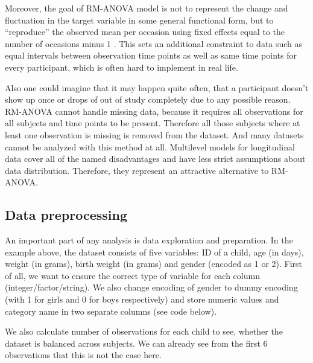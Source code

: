 \documentclass[
  12pt,
]{article}
\begin{document}
Moreover, the goal of RM-ANOVA model is not to represent the change and
fluctuation in the target variable in some general functional form, but
to ``reproduce'' the observed mean per occasion using fixed effects
equal to the number of occasions minus 1 \autocite[p.96]{hoffman_2015}.
This sets an additional constraint to data such as equal intervals
between observation time points as well as same time points for every
participant, which is often hard to implement in real life.

Also one could imagine that it may happen quite often, that a
participant doesn't show up once or drops of out of study completely due
to any possible reason. RM-ANOVA cannot handle missing data, because it
requires all observations for all subjects and time points to be
present. Therefore all those subjects where at least one observation is
missing is removed from the dataset. And many datasets cannot be
analyzed with this method at all. Multilevel models for longitudinal
data cover all of the named disadvantages and have less strict
assumptions about data distribution. Therefore, they represent an
attractive alternative to RM-ANOVA.

\subsection{Data preprocessing}

An important part of any analysis is data exploration and preparation.
In the example above, the dataset consists of five variables: ID of a
child, age (in days), weight (in grams), birth weight (in grams) and
gender (encoded as 1 or 2). First of all, we want to ensure the correct
type of variable for each column (integer/factor/string). We also change
encoding of gender to dummy encoding (with 1 for girls and 0 for boys
respectively) and store numeric values and category name in two separate
columns (see code below).

We also calculate number of observations for each child to see, whether
the dataset is balanced across subjects. We can already see from the
first 6 observations that this is not the case here.
\end{document}
